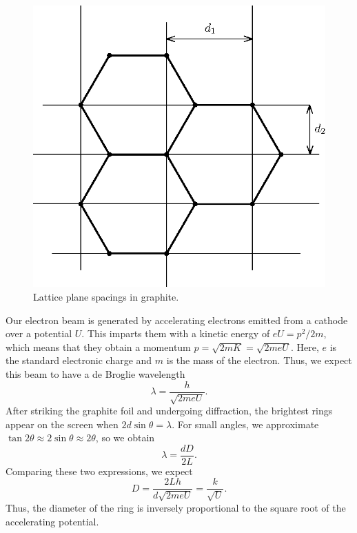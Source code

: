 \documentclass[11pt]{article}
\begin{document}
        \begin{figure}[H]
        \centering
        \includegraphics[scale=0.8]{./graphite.eps}
        \caption{Lattice plane spacings in graphite.}
        \label{fig:graphite}
        \end{figure}

        Our electron beam is generated by accelerating electrons emitted from a cathode over a potential $U$. This imparts them with a kinetic
        energy of $eU = p^2 /2m$, which means that they obtain a momentum $p = \sqrt{2mK} = \sqrt{2meU}$. 
        Here, $e$ is the standard electronic charge and $m$ is the mass of the electron.
        Thus, we expect this beam to have a de Broglie wavelength
        \[
                \lambda = \frac{h}{\sqrt{2meU}}.
        \]
        After striking the graphite foil and undergoing diffraction, the brightest rings appear on the screen when $2d\sin\theta = \lambda$.
        For small angles, we approximate $\tan{2\theta} \approx 2\sin\theta \approx 2\theta$, so we obtain
        \[
                \lambda = \frac{dD}{2L}.
        \]
        Comparing these two expressions, we expect
        \[
                D = \frac{2Lh}{d\sqrt{2meU}} = \frac{k}{\sqrt{U}}.
        \]
        Thus, the diameter of the ring is inversely proportional to the square root of the accelerating potential.
\end{document}
